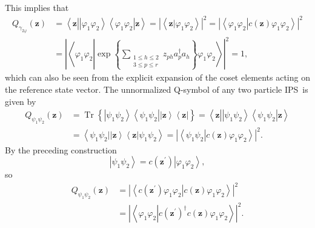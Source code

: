 \documentclass[aps,preprint]{revtex4}%
\begin{document}
This implies that
\begin{align}
Q_{\gamma_{2\varphi}}\left(  \mathbf{z}\right)   &  =\left\langle
\mathbf{z}\left\vert \left\vert \varphi_{1}\varphi_{2}\right\rangle
\left\langle \varphi_{1}\varphi_{2}\right\vert \right.  \mathbf{z}%
\right\rangle =\left\vert \left\langle \left.  \mathbf{z}\right\vert
\varphi_{1}\varphi_{2}\right\rangle \right\vert ^{2}=\left\vert \left\langle
\left.  \varphi_{1}\varphi_{2}\right\vert c\left(  \mathbf{z}\right)
\varphi_{1}\varphi_{2}\right\rangle \right\vert ^{2}\nonumber\\
&  =\left\vert \left\langle \varphi_{1}\varphi_{2}\left\vert \exp\left\{
\sum\limits_{\substack{1\leq h\leq2\\3\leq p\leq r}}z_{ph}a_{p}^{\dagger}%
a_{h}\right\}  \varphi_{1}\varphi_{2}\right.  \right\rangle \right\vert
^{2}=1,
\end{align}
which can also be seen from the explicit expansion of the coset elements
acting on the reference state vector. The unnormalized Q-symbol of any two
particle IPS\ is given by
\begin{align}
Q_{\psi_{1}\psi_{2}}\left(  \mathbf{z}\right)   &  =\operatorname*{Tr}\left\{
\left\vert \psi_{1}\psi_{2}\right\rangle \left\langle \psi_{1}\psi
_{2}\right\vert \left\vert \mathbf{z}\right\rangle \left\langle \mathbf{z}%
\right\vert \right\}  =\left\langle \mathbf{z}\left\vert \left\vert \psi
_{1}\psi_{2}\right\rangle \left\langle \psi_{1}\psi_{2}\right\vert \right.
\mathbf{z}\right\rangle \nonumber\\
&  =\left\langle \psi_{1}\psi_{2}\left\vert \left\vert \mathbf{z}\right\rangle
\left\langle \mathbf{z}\right\vert \right.  \psi_{1}\psi_{2}\right\rangle
=\left\vert \left\langle \psi_{1}\psi_{2}\left\vert c\left(  \mathbf{z}%
\right)  \varphi_{1}\varphi_{2}\right.  \right\rangle \right\vert ^{2}.
\end{align}
By the preceding construction
\begin{equation}
\left\vert \psi_{1}\psi_{2}\right\rangle =c\left(  \mathbf{z}^{\prime}\right)
\left\vert \varphi_{1}\varphi_{2}\right\rangle ,
\end{equation}
so%
\begin{align}
Q_{\psi_{1}\psi_{2}}\left(  \mathbf{z}\right)   &  =\left\vert \left\langle
c\left(  \mathbf{z}^{\prime}\right)  \varphi_{1}\varphi_{2}\left\vert c\left(
\mathbf{z}\right)  \varphi_{1}\varphi_{2}\right.  \right\rangle \right\vert
^{2}\nonumber\\
&  =\left\vert \left\langle \varphi_{1}\varphi_{2}\left\vert c\left(
\mathbf{z}^{\prime}\right)  ^{\dagger}c\left(  \mathbf{z}\right)  \varphi
_{1}\varphi_{2}\right.  \right\rangle \right\vert ^{2}.
\end{align}
\end{document}
